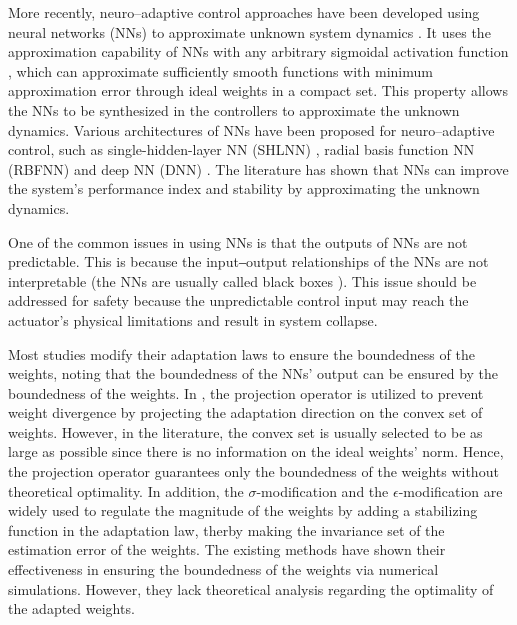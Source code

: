 \documentclass[letterpaper, 10 pt, conference]{ieeeconf}  %
\begin{document}
More recently, neuro–adaptive control approaches have been developed using neural networks (NNs) to approximate unknown system dynamics \cite{RN24}.
It uses the approximation capability of NNs with any arbitrary sigmoidal activation function \cite{RN35}, which can approximate sufficiently smooth functions with minimum approximation error through ideal weights in a compact set.
This property allows the NNs to be synthesized in the controllers to approximate the unknown dynamics.
Various architectures of NNs have been proposed for neuro–adaptive control, such as single-hidden-layer NN (SHLNN) \cite{RN16, RN18}, radial basis function NN (RBFNN) \cite{RN17, RN31} and deep NN (DNN) \cite{RN36}.
The literature has shown that NNs can improve the system's performance index and stability by approximating the unknown dynamics.


One of the common issues in using NNs is that the outputs of NNs are not predictable.
This is because the input‒output relationships of the NNs are not interpretable (\ie the NNs are usually called black boxes \cite{RN8, RN9}).
This issue should be addressed for safety because the unpredictable control input may reach the actuator's physical limitations and result in system collapse.

Most studies modify their adaptation laws to ensure the boundedness of the weights, noting that the boundedness of the NNs' output can be ensured by the boundedness of the weights.
In \cite{RN31, RN36}, the projection operator is utilized to prevent weight divergence by projecting the adaptation direction on the convex set of weights.
However, in the literature, the convex set is usually selected to be as large as possible since there is no information on the ideal weights' norm.
Hence, the projection operator guarantees only the boundedness of the weights without theoretical optimality.
In addition, the $\sigma$-modification \cite{RN17} and the $\epsilon$-modification \cite{RN16, RN18} are widely used to regulate the magnitude of the weights by adding a stabilizing function in the adaptation law, therby making the invariance set of the estimation error of the weights. 
The existing methods have shown their effectiveness in ensuring the boundedness of the weights via numerical simulations.
However, they lack theoretical analysis regarding the optimality of the adapted weights.
\end{document}
